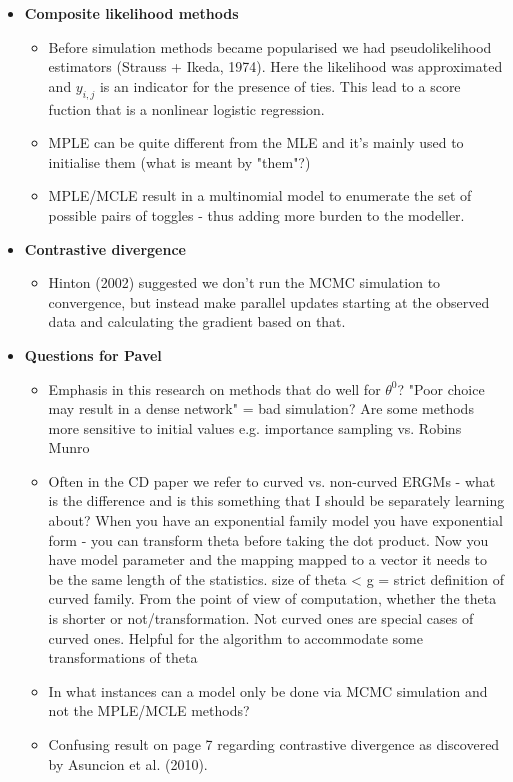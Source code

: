 \begin{itemize}
    \item \textbf{Composite likelihood methods}
    \begin{itemize}
        \item Before simulation methods became popularised we had pseudolikelihood estimators (Strauss + Ikeda, 1974). Here the likelihood was approximated and $y_{i,j}$ is an indicator for the presence of ties. This lead to a score fuction that is a nonlinear logistic regression.
        \item MPLE can be quite different from the MLE and it's mainly used to initialise them (what is meant by "them"?)
        \item MPLE/MCLE result in a multinomial model to enumerate the set of possible pairs of toggles - thus adding more burden to the modeller.
    \end{itemize}
    \item \textbf{Contrastive divergence}
    \begin{itemize}
        \item Hinton (2002) suggested we don't run the MCMC simulation to convergence, but instead make parallel updates starting at the observed data and calculating the gradient based on that.
    \end{itemize}
    \item \textbf{Questions for Pavel}
    \begin{itemize}
    \item Emphasis in this research on methods that do well for $\theta^{0}$? "Poor choice may result in a dense network" = bad simulation?
    Are some methods more sensitive to initial values e.g. importance sampling vs. Robins Munro
    \item Often in the CD paper we refer to curved vs. non-curved ERGMs - what is the difference and is this something that I should be separately learning about?
    When you have an exponential family model you have exponential form - you can transform theta before taking the dot product. Now you have model parameter and the mapping mapped to a vector it needs to be the same length of the statistics. size of theta < g = strict definition of curved family. From the point of view of computation, whether the theta is shorter or not/transformation. Not curved ones are special cases of curved ones. Helpful for the algorithm to accommodate some transformations of theta
    \item In what instances can a model only be done via MCMC simulation and not the MPLE/MCLE methods?
    \item Confusing result on page 7 regarding contrastive divergence as discovered by Asuncion et al. (2010).

\end{itemize}
\end{itemize}
